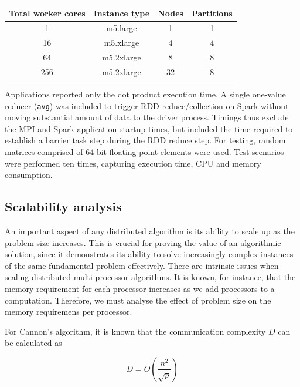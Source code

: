 \documentclass[fleqn,10pt]{SelfArx} %
\begin{document}
\begin{center}
	\begin{tabular}{ |c|c|c|c| } 
	 \hline
	 Total worker cores & Instance type & Nodes & Partitions  \\ 
	 \hline\hline
	 1 & m5.large & 1 & 1 \\ 
	 \hline
	 16 & m5.xlarge & 4 & 4 \\ 
	 \hline
	 64 & m5.2xlarge & 8 & 8 \\ 
	 \hline
	 256 & m5.2xlarge & 32 & 8 \\ 
	 \hline
	\end{tabular}
\end{center}
	

Applications reported only the dot product execution time. A single one-value reducer (\texttt{avg}) was included to trigger RDD reduce/collection on Spark without moving substantial amount of data to the driver process. Timings thus exclude the MPI and Spark application startup times, but included the time required to establish a barrier task step during the RDD reduce step. For testing, random matrices comprised of 64-bit floating point elements were used. Test scenarios were performed ten times, capturing execution time, CPU and memory consumption.


\subsection{Scalability analysis} %
\label{sub:scalability_analysis}


An important aspect of any distributed algorithm is its ability to scale up as the problem size increases. This is crucial for proving the value of an algorithmic solution, since it demonstrates its ability to solve increasingly complex instances of the same fundamental problem effectively. There are intrinsic issues when scaling distributed multi-processor algorithms. It is known, for instance, that the memory requirement for each processor increases as we add processors to a computation. Therefore, we must analyse the effect of problem size on the memory requiremens per processor. 

For Cannon's algorithm, it is known that the communication complexity $D$ can be calculated as 

\begin{equation}
	D = O(\frac{n^2}{\sqrt{p}})
\end{equation}
\end{document}
